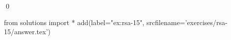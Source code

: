 
\begin{ex} 
  \label{ex:rsa-15}
  
  \qed
\end{ex} 
\begin{python0}
from solutions import *
add(label="ex:rsa-15",
    srcfilename='exercises/rsa-15/answer.tex') 
\end{python0}
